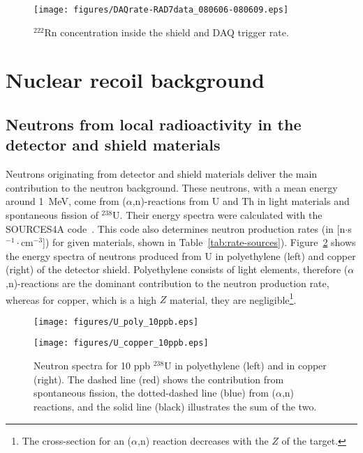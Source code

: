 \begin{figure}[!h]
\begin{center}
 \texttt{[image: figures/DAQrate-RAD7data\_080606-080609.eps]}
\caption{$^{222}$Rn concentration inside the shield and DAQ trigger rate.}
\label{fig:RnConc_DAQrate}
\end{center}
\end{figure}


\section{Nuclear recoil background}
\label{sec:nuclearRecoils}

\subsection{Neutrons from local radioactivity in the detector and shield materials}
\label{sec:det-shield}

Neutrons originating from detector and shield materials deliver the main contribution to
the neutron background. These neutrons, with a mean energy around 1~MeV, 
come from ($\alpha$,n)-reactions from U and Th in light materials and spontaneous fission of
$^{238}$U. Their energy spectra were calculated with the SOURCES4A
code~\cite{sources4A, vito}. This code also determines neutron production rates
(in [n$\cdot$s$^{-1}\cdot$cm$^{-3}$]) for given materials, shown in Table~\ref{tab:rate-sources}).
 Figure~\ref{sources_spectra} shows the energy spectra of
neutrons produced from U in polyethylene (left) and copper (right) of the detector shield.
Polyethylene consists of light elements, therefore ($\alpha$,n)-reactions are the dominant
contribution to the neutron production rate, whereas for copper, 
which is a high $Z$ material, they are
negligible\footnote{The
cross-section for an ($\alpha$,n) reaction decreases with the $Z$ of the target.}.

\begin{figure}[h!]
  \begin{minipage}[]{0.5\textwidth}
    \texttt{[image: figures/U\_poly\_10ppb.eps]}
  \end{minipage}
  \hfill
  \begin{minipage}[]{0.5\textwidth}
    \texttt{[image: figures/U\_copper\_10ppb.eps]}
  \end{minipage}
\caption{Neutron spectra for 10 ppb $^{238}$U in polyethylene (left) and in copper
  (right). The dashed line (red) shows the contribution from spontaneous
  fission, the dotted-dashed line (blue) from ($\alpha$,n)
reactions, and the solid line (black) illustrates the sum of the two.}
\label{sources_spectra}
\end{figure}


